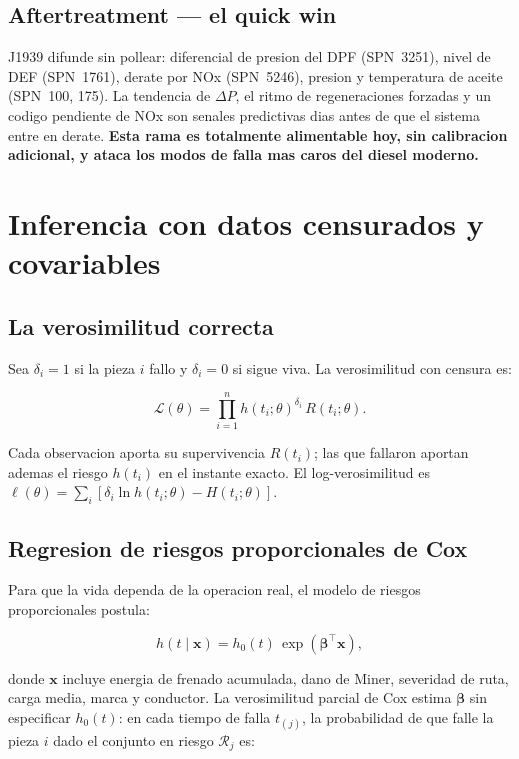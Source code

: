 \documentclass[11pt,a4paper]{article}
\begin{document}
\subsection{Aftertreatment --- el quick win}

J1939 difunde sin pollear: diferencial de presion del DPF (SPN~3251),
nivel de DEF (SPN~1761), derate por NOx (SPN~5246), presion y temperatura
de aceite (SPN~100, 175). La tendencia de $\Delta P$, el ritmo de
regeneraciones forzadas y un codigo pendiente de NOx son senales predictivas
dias antes de que el sistema entre en derate. \textbf{Esta rama es totalmente
alimentable hoy, sin calibracion adicional, y ataca los modos de falla
mas caros del diesel moderno.}

\section{Inferencia con datos censurados y covariables}

\subsection{La verosimilitud correcta}

Sea $\delta_i = 1$ si la pieza $i$ fallo y $\delta_i = 0$ si sigue viva.
La verosimilitud con censura es:

$$\mathcal{L}(\theta) = \prod_{i=1}^{n}
  h(t_i;\theta)^{\delta_i}\,R(t_i;\theta).$$

Cada observacion aporta su supervivencia $R(t_i)$; las que fallaron
aportan ademas el riesgo $h(t_i)$ en el instante exacto. El log-verosimilitud es
$\ell(\theta) = \sum_i[\delta_i \ln h(t_i;\theta) - H(t_i;\theta)]$.

\subsection{Regresion de riesgos proporcionales de Cox}

Para que la vida dependa de la operacion real, el modelo de
riesgos proporcionales postula:

$$h(t \mid \mathbf{x}) = h_0(t)\,\exp(\boldsymbol{\beta}^{\top}\mathbf{x}),$$

donde $\mathbf{x}$ incluye energia de frenado acumulada, dano de Miner,
severidad de ruta, carga media, marca y conductor. La verosimilitud parcial
de Cox estima $\boldsymbol{\beta}$ sin especificar $h_0(t)$: en cada tiempo
de falla $t_{(j)}$, la probabilidad de que falle la pieza $i$ dado el
conjunto en riesgo $\mathcal{R}_j$ es:
\end{document}
